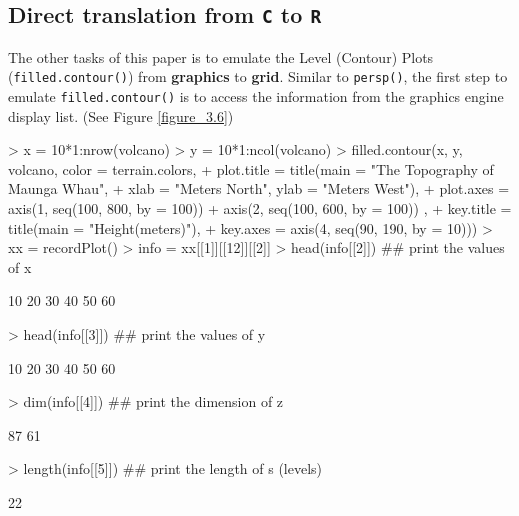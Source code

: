 \documentclass[11pt,twoside]{report}
\begin{document}
\subsection{Direct translation from \texttt{C} to \texttt{R}}
The other tasks of this paper is to emulate the Level (Contour) Plots (\texttt{filled.contour()}) from \textbf{graphics} to \textbf{grid}. Similar to \texttt{persp()}, the first step to emulate \texttt{filled.contour()} is to access the information from the graphics engine display list. (See Figure \ref{figure_3.6})
\begin{Schunk}
\begin{Sinput}
> x = 10*1:nrow(volcano)
> y = 10*1:ncol(volcano)
> filled.contour(x, y, volcano, color = terrain.colors,
+               plot.title = title(main = "The Topography of Maunga Whau",
+               xlab = "Meters North", ylab = "Meters West"),
+               plot.axes = { axis(1, seq(100, 800, by = 100))
+               axis(2, seq(100, 600, by = 100)) },
+               key.title = title(main = "Height\n(meters)"),
+               key.axes = axis(4, seq(90, 190, by = 10)))
> xx = recordPlot()
> info = xx[[1]][[12]][[2]]
> head(info[[2]])  ## print the values of x
\end{Sinput}
\begin{Soutput}
[1] 10 20 30 40 50 60
\end{Soutput}
\begin{Sinput}
> head(info[[3]])  ## print the values of y
\end{Sinput}
\begin{Soutput}
[1] 10 20 30 40 50 60
\end{Soutput}
\begin{Sinput}
> dim(info[[4]])  ## print the dimension of z
\end{Sinput}
\begin{Soutput}
[1] 87 61
\end{Soutput}
\begin{Sinput}
> length(info[[5]])  ## print the length of s (levels)
\end{Sinput}
\begin{Soutput}
[1] 22
\end{Soutput}
\end{Schunk}
\end{document}
